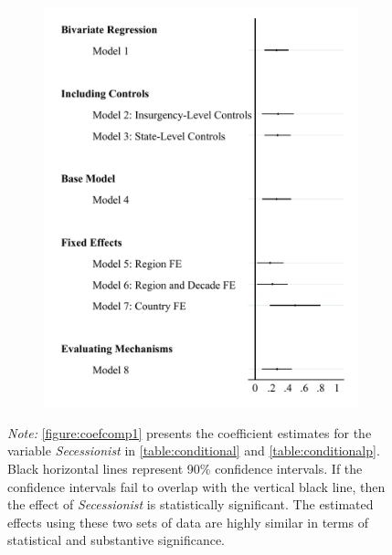 \documentclass[12pt, letterpaper]{article}
\begin{document}
\begin{figure}[h]
\begin{subfigure}{0.45\textwidth}
    \includegraphics[width=\textwidth]{coefpanel.pdf}
    \end{subfigure}
  \begin{tablenotes}
\raggedright \footnotesize{\textit{Note:} \autoref{figure:coefcomp1} presents the coefficient estimates for the variable \textit{Secessionist} in \autoref{table:conditional} and \autoref{table:conditionalp}. Black horizontal lines represent 90\% confidence intervals. If the confidence intervals fail to overlap with the vertical black line, then the effect of \textit{Secessionist} is statistically significant. The estimated effects using these two sets of data are highly similar in terms of statistical and substantive significance.}
\end{tablenotes}
\end{figure}
\end{document}
